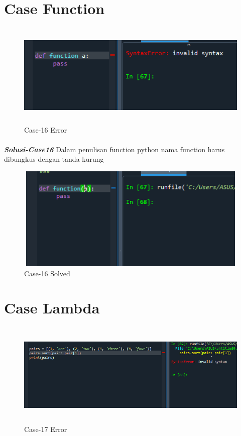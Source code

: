 \documentclass[12pt,a4paper]{article}
\begin{document}
\newpage
\section{Case Function}
\begin{figure}[ht]
    \centerline{\includegraphics[width=15cm,height=5cm]{image/case16.png}}
    \renewcommand{\figurename}{Gambar}
    \caption{Case-16 Error}
\end{figure}
\paragraph{}\textbf{\textit{Solusi-Case16}} {Dalam penulisan function python nama function harus dibungkus dengan tanda kurung}
\begin{figure}[ht]
    \centerline{\includegraphics[width=15cm,height=5cm]{image/case16-solved.png}}
    \renewcommand{\figurename}{Gambar}
    \caption{Case-16 Solved}
\end{figure}

\newpage
\section{Case Lambda}
\begin{figure}[ht]
    \centerline{\includegraphics[width=15cm,height=5cm]{image/case17.png}}
    \renewcommand{\figurename}{Gambar}
    \caption{Case-17 Error}
\end{figure}
\end{document}
